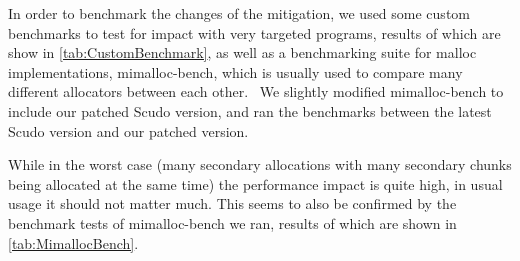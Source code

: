 \documentclass[a4paper,11pt,oneside]{report}
\begin{document}
In order to benchmark the changes of the mitigation, we used some custom benchmarks to
test for impact with very targeted programs, results of which are show in
\autoref{tab:CustomBenchmark}, as well as a benchmarking suite for malloc implementations,
mimalloc-bench, which is usually used to compare many different allocators between each
other.~\cite{mimalloc-bench} We slightly modified mimalloc-bench to include our patched
Scudo version, and ran the benchmarks between the latest Scudo version and our patched
version.

While in the worst case (many secondary allocations with many secondary chunks being
allocated at the same time) the performance impact is quite high, in usual usage it should
not matter much. This seems to also be confirmed by the benchmark tests of mimalloc-bench
we ran, results of which are shown in \autoref{tab:MimallocBench}.
\end{document}
